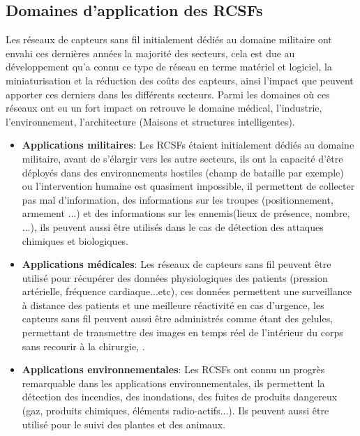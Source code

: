 \subsection{Domaines d'application des RCSFs}
Les réseaux de capteurs sans fil initialement dédiés au domaine militaire ont envahi ces dernières années la majorité des secteurs, cela est due au développement qu'a connu ce type de réseau en terme matériel et logiciel, la miniaturisation et la réduction des coûts des capteurs, ainsi l'impact que peuvent apporter ces derniers  dans les différents secteurs. Parmi les domaines où ces réseaux ont eu un fort impact on retrouve le domaine médical, l'industrie, l'environnement, l'architecture (Maisons et structures intelligentes).  
\begin{itemize}
		\item \textbf{Applications militaires}: Les RCSFs étaient initialement dédiés au domaine militaire, avant de s'élargir vers les autre secteurs, ils ont la capacité d'être déployés dans des environnements hostiles (champ de bataille par exemple) ou l'intervention humaine est quasiment impossible, il permettent de collecter pas mal d'information, des informations sur les troupes (positionnement, armement ...) et des informations sur les ennemis(lieux de présence, nombre,  ...), ils peuvent aussi être utilisés dans le cas de détection des attaques chimiques et biologiques.\\  

		\item \textbf{Applications médicales}: Les réseaux de capteurs sans fil peuvent être utilisé pour récupérer 
		des données physiologiques des patients (pression artérielle, fréquence cardiaque...etc), ces données permettent une surveillance à distance des patients et une meilleure réactivité en cas d'urgence, les capteurs sans fil peuvent aussi être administrés comme étant des gelules, permettant de transmettre des images en temps réel de l'intérieur du corps sans recourir à la chirurgie, .\\
		
		\item \textbf{Applications environnementales}: Les RCSFs ont connu un progrès remarquable dans les applications environnementales, ils permettent la détection des incendies, des inondations, des fuites de produits dangereux (gaz, produits chimiques, éléments radio-actifs...). Ils peuvent aussi être utilisé pour le suivi des plantes et des animaux. \\
		

\end{itemize}
